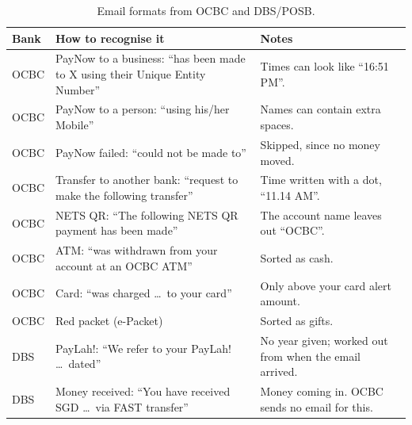 \documentclass[10pt]{article}
\begin{document}
\begin{table}[H]
\centering\small
\begin{tabularx}{\linewidth}{@{}lLL@{}}
\toprule
\textbf{Bank} & \textbf{How to recognise it} & \textbf{Notes} \\
\midrule
OCBC & PayNow to a business: ``has been made to X using their Unique Entity Number'' & Times can look like ``16:51 PM''. \\
OCBC & PayNow to a person: ``using his/her Mobile'' & Names can contain extra spaces. \\
OCBC & PayNow failed: ``could not be made to'' & Skipped, since no money moved. \\
OCBC & Transfer to another bank: ``request to make the following transfer'' & Time written with a dot, ``11.14 AM''. \\
OCBC & NETS QR: ``The following NETS QR payment has been made'' & The account name leaves out ``OCBC''. \\
OCBC & ATM: ``was withdrawn from your account at an OCBC ATM'' & Sorted as cash. \\
OCBC & Card: ``was charged \ldots\ to your card'' & Only above your card alert amount. \\
OCBC & Red packet (e-Packet) & Sorted as gifts. \\
DBS & PayLah!: ``We refer to your PayLah! \ldots\ dated'' & No year given; worked out from when the email arrived. \\
DBS & Money received: ``You have received SGD \ldots\ via FAST transfer'' & Money coming in. OCBC sends no email for this. \\
\bottomrule
\end{tabularx}
\caption{Email formats from OCBC and DBS/POSB.}
\end{table}
\end{document}
